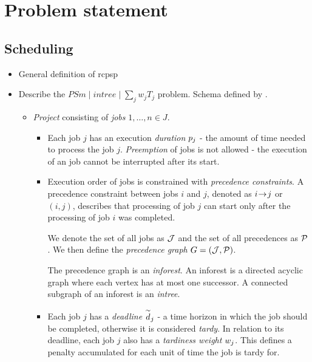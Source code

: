 \chapter{Problem statement}

\section{Scheduling}

\begin{itemize}
    \item General definition of \ac{rcpsp}

    \item Describe the $PSm \;|\; intree \;|\; \sum_{j} w_j T_j$ problem.
        Schema defined by \citet{BRUCKER1999}.
    \begin{itemize}
        \item \emph{Project} consisting of \emph{jobs} $1, \dots, n \in J$.
        \begin{itemize}
            \item Each job $j$ has an execution \emph{duration} $p_{j}$ - the amount of time needed to process the job $j$.
                \emph{Preemption} of jobs is not allowed - the execution of an job cannot be interrupted after its start.

            \item Execution order of jobs is constrained with \emph{precedence constraints}.
                A precedence constraint between jobs $i$ and $j$, denoted as $i \hspace{-0.2em} \rightarrow \hspace{-0.2em} j$ or $(i, j)$,
                describes that processing of job $j$ can start only after the processing of job $i$ was completed.

                We denote the set of all jobs as $\mathcal{J}$ and the set of all precedences as $\mathcal{P}$.
                We then define the \emph{precedence graph} $G = (\mathcal{J}, \mathcal{P})$.

                The precedence graph is an \emph{inforest}. An inforest is a directed acyclic graph
                where each vertex has at most one successor. A connected subgraph of an inforest
                is an \emph{intree}.

            \item Each job $j$ has a \emph{deadline} $\overset{\sim}{d}_{j}$ - a time horizon in which the job
                should be completed, otherwise it is considered \emph{tardy}. In relation to its deadline,
                each job $j$ also has a \emph{tardiness weight} $w_{j}$. This defines a penalty accumulated
                for each unit of time the job is tardy for.
        \end{itemize}


\end{itemize}
\end{itemize}
